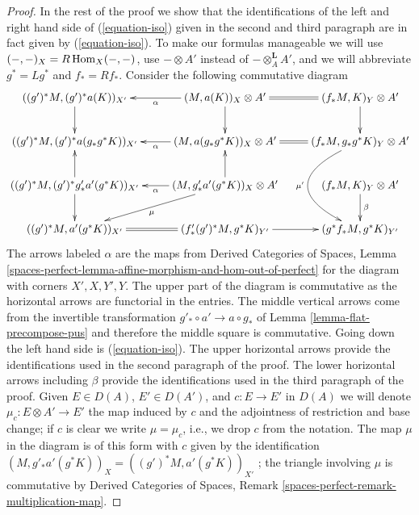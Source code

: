 \begin{proof}
\medskip\noindent
In the rest of the proof we show that the identifications of
the left and right hand side of (\ref{equation-iso})
given in the second and third paragraph are in fact given by
(\ref{equation-iso}). To make our formulas manageable
we will use $(-, -)_X = R\mathop{\mathrm{Hom}}\nolimits_X(-, -)$, use $- \otimes A'$
instead of $- \otimes_A^\mathbf{L} A'$, and we will abbreviate
$g^* = Lg^*$ and $f_* = Rf_*$. Consider the following
commutative diagram
$$
\xymatrix{
((g')^*M, (g')^*a(K))_{X'} \ar[d] &
(M, a(K))_X \otimes A' \ar[l]^-\alpha \ar[d] &
(f_*M, K)_Y \otimes A' \ar@{=}[l] \ar[d] \\
((g')^*M, (g')^*a(g_*g^*K))_{X'} &
(M, a(g_*g^*K))_X \otimes A' \ar[l]^-\alpha &
(f_*M, g_*g^*K)_Y \otimes A' \ar@{=}[l] \ar@/_4pc/[dd]_{\mu'} \\
((g')^*M, (g')^*g'_*a'(g^*K))_{X'} \ar[u] \ar[d] &
(M, g'_*a'(g^*K))_X \otimes A' \ar[u] \ar[l]^-\alpha \ar[ld]^\mu &
(f_*M, K)_Y \otimes A' \ar[d]^\beta \\
((g')^*M, a'(g^*K))_{X'} &
(f'_*(g')^*M, g^*K)_{Y'} \ar@{=}[l] \ar[r] &
(g^*f_*M, g^*K)_{Y'}
}
$$
The arrows labeled $\alpha$ are the maps from
Derived Categories of Spaces, Lemma
\ref{spaces-perfect-lemma-affine-morphism-and-hom-out-of-perfect}
for the diagram with corners $X', X, Y', Y$.
The upper part of the diagram is commutative as the horizontal arrows are
functorial in the entries.
The middle vertical arrows come from the invertible transformation
$g'_* \circ a' \to a \circ g_*$  of Lemma \ref{lemma-flat-precompose-pus}
and therefore the middle square is commutative.
Going down the left hand side is (\ref{equation-iso}).
The upper horizontal arrows provide the identifications used in the
second paragraph of the proof.
The lower horizontal arrows including $\beta$ provide the identifications
used in the third paragraph of the proof. Given $E \in D(A)$,
$E' \in D(A')$, and $c : E \to E'$ in $D(A)$ we will denote
$\mu_c : E \otimes A' \to E'$ the map induced by $c$
and the adjointness of restriction and base change;
if $c$ is clear we write $\mu = \mu_c$, i.e., we
drop $c$ from the notation. The map $\mu$ in the diagram is of this
form with $c$ given by the identification
$(M, g'_*a'(g^*K))_X = ((g')^*M, a'(g^*K))_{X'}$
; the triangle involving $\mu$ is commutative by
Derived Categories of Spaces, Remark
\ref{spaces-perfect-remark-multiplication-map}.


\end{proof}
